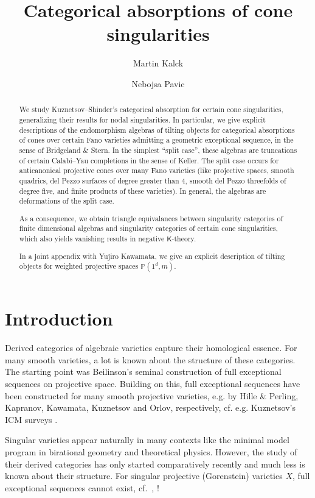 \documentclass[a4paper,11pt, reqno]{amsart}
\title{Categorical absorptions of cone singularities 
}
\author{Martin Kalck} \author{Nebojsa Pavic}
\def\P{\mathbb P}
\newcommand{\bK}{\mathsf{K}}
\theoremstyle{plain}
\theoremstyle{definition}
\numberwithin{equation}{section}
\begin{document}
\begin{abstract}
    We study Kuznetsov--Shinder's categorical absorption for certain cone singularities, generalizing their results for nodal singularities. In particular, we give explicit descriptions of the endomorphism algebras of tilting objects for categorical absorptions of cones over certain Fano varieties admitting a geometric exceptional sequence, in the sense of Bridgeland \& Stern. In the simplest ``split case'', these algebras are truncations of certain Calabi--Yau completions in the sense of Keller. The split case occurs for anticanonical projective cones over many Fano varieties (like projective spaces, smooth quadrics, del Pezzo surfaces of degree greater than $4$, smooth del Pezzo threefolds of degree five, and finite products of these varieties). 
    In general, the algebras are deformations of the split case. 

    As a consequence, we  obtain triangle equivalances between singularity categories of finite dimensional algebras and singularity categories of certain cone singularities, which also yields vanishing results in negative $\bK$-theory.

    In a joint appendix with Yujiro Kawamata, we give an explicit description of tilting objects for weighted projective spaces $\P(1^d, m)$.
\end{abstract}
\sloppy


\maketitle
\tableofcontents

\section{Introduction}

Derived categories of algebraic varieties capture their homological essence. For many smooth varieties, a lot is known about the structure of these categories. The starting point was Beilinson's seminal construction of full exceptional sequences on projective space.
Building on this, full exceptional sequences have been constructed for many smooth projective varieties, e.g. by Hille \& Perling, Kapranov, Kawamata, Kuznetsov and Orlov, respectively, cf. e.g. Kuznetsov's ICM surveys \cite{KuzICM1, KuzICM2} . 

Singular varieties appear naturally in many contexts like the minimal model program in birational geometry and theoretical physics. However, the study of their derived categories has only started comparatively recently and much less is known about their structure.
For singular projective (Gorenstein) varieties $X$, full exceptional sequences cannot exist, cf.\ \cite[Cor. 4.15]{ks2}, \cite{KPS}! 
\end{document}
